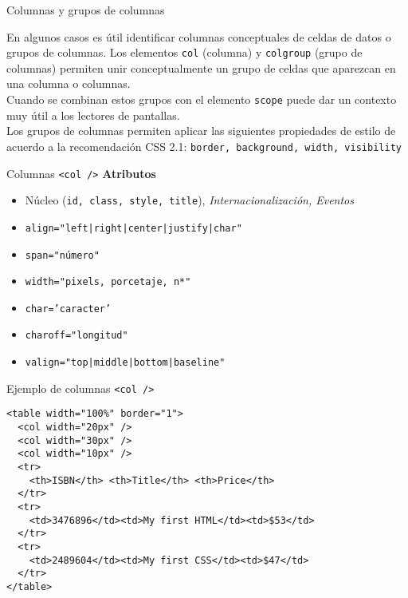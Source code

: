 \documentclass{beamer}
\begin{document}
\begin{frame}{Columnas y grupos de columnas} %
\begin{center}
    En algunos casos es útil identificar columnas conceptuales de celdas de
    datos o grupos de columnas. Los elementos \texttt{col} (columna) y
    \texttt{colgroup} (grupo de columnas) permiten unir conceptualmente un
    grupo de celdas que aparezcan en una columna o columnas.\\[0.2cm]
    \pause
    Cuando se combinan estos grupos con el elemento \texttt{scope} puede dar un
    contexto muy útil a los lectores de pantallas. \\[0.2cm]
    \pause
    Los grupos de columnas permiten aplicar las siguientes propiedades de
    estilo de acuerdo a la recomendación CSS 2.1: \texttt{border, background,
    width, visibility}
\end{center}
\end{frame}

\begin{frame}{Columnas \texttt{<col />}} %
    \textbf{Atributos}
    \begin{itemize}
        \item Núcleo (\texttt{id, class, style, title}),
        \textit{Internacionalización, Eventos}
         \item \texttt{align="left|right|center|justify|char"}
         \item \texttt{span="número"}
         \item \texttt{width="pixels, porcetaje, n*"}
        \item \texttt{char='caracter'}
        \item \texttt{charoff="longitud"}
        \item \texttt{valign="top|middle|bottom|baseline"}
    \end{itemize}
    
\end{frame}

\begin{frame}[fragile]{Ejemplo de columnas \texttt{<col />}} %
\begin{lstlisting}
<table width="100%" border="1">
  <col width="20px" /> 
  <col width="30px" />
  <col width="10px" />
  <tr> 
    <th>ISBN</th> <th>Title</th> <th>Price</th>
  </tr>
  <tr>
    <td>3476896</td><td>My first HTML</td><td>$53</td>
  </tr>
  <tr>
    <td>2489604</td><td>My first CSS</td><td>$47</td>
  </tr>
</table>
\end{lstlisting}
\end{frame}
\end{document}
